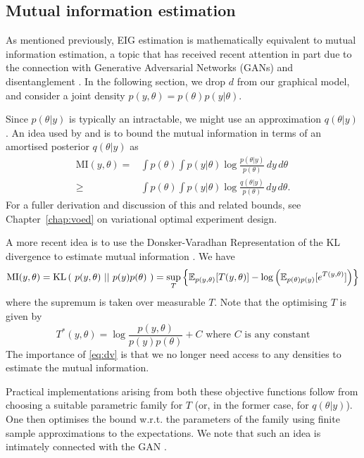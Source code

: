 \subsection{Mutual information estimation}
\label{sec:mie}
As mentioned previously, EIG estimation is mathematically equivalent to mutual information estimation, a topic that has received recent attention in part due to the connection with Generative Adversarial Networks (GANs) \cite{infogan} and disentanglement \cite{tianqichen}. In the following section, we drop $d$ from our graphical model, and consider a joint density $p(y, \theta) = p(\theta)p(y|\theta)$.

Since $p(\theta|y)$ is typically an intractable, we might use an approximation $q(\theta|y)$. An idea used by \cite{ba} and \cite{infogan} is to bound the mutual information in terms of an amortised posterior $q(\theta|y)$ as
\begin{align}
	\text{MI}(y, \theta) =& \int p(\theta) \int p(y|\theta) \log \frac{p(\theta | y)}{p(\theta)} \, dy \, d\theta \\
	\ge & \int p(\theta) \int p(y|\theta) \log \frac{q(\theta | y)}{p(\theta)} \, dy \, d\theta.
\end{align}
For a fuller derivation and discussion of this and related bounds, see Chapter~\ref{chap:voed} on variational optimal experiment design.

A more recent idea is to use the Donsker-Varadhan Representation of the KL divergence to estimate mutual information \cite{mine}. We have
\begin{equation}
	\label{eq:dv}
	\text{MI}(y, \theta) = \text{KL}\left(\ p(y, \theta)\ ||\ p(y)p(\theta)\ \right) = \sup_T \left\{ \mathbb{E}_{p(y,\theta)} [T(y, \theta)] - \log\left(\mathbb{E}_{p(\theta)p(y)}[e^{T(y,\theta)}] \right)  \right\}
\end{equation}
where the supremum is taken over measurable $T$. Note that the optimising $T$ is given by
\begin{equation}
	T^*(y, \theta) = \log\frac{p(y,\theta)}{p(y)p(\theta)} + C \text{ where }C\text{ is any constant}
\end{equation}
The importance of \eqref{eq:dv} is that we no longer need access to any densities to estimate the mutual information.

Practical implementations arising from both these objective functions follow from choosing a suitable parametric family for $T$ (or, in the former case, for $q(\theta|y)$). One then optimises the bound w.r.t. the parameters of the family using finite sample approximations to the expectations. We note that such an idea is intimately connected with the GAN \cite{fgan}.


